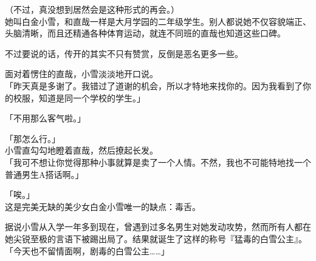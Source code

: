 （不过，真没想到居然会是这种形式的再会。）\\

她叫白金小雪，和直哉一样是大月学园的二年级学生。别人都说她不仅容貌端正、头脑清晰，而且还精通各种体育运动，就连不同班的直哉也知道这些口碑。

不过要说的话，传开的其实不只有赞赏，反倒是恶名更多一些。

面对着愣住的直哉，小雪淡淡地开口说。\\

「昨天真是多谢了。我错过了道谢的机会，所以才特地来找你的。因为我看到了你的校服，知道是同一个学校的学生。」

「不用那么客气啦。」

「那怎么行。」\\

小雪直勾勾地瞪着直哉，然后撩起长发。\\

「我可不想让你觉得那种小事就算是卖了一个人情。不然，我也不可能特地找一个普通男生A搭话啊。」

「唉。」\\

这是完美无缺的美少女白金小雪唯一的缺点：毒舌。

据说小雪从入学一年多到现在，曾遇到过多名男生对她发动攻势，然而所有人都在她尖锐至极的言语下被踢出局了。结果就诞生了这样的称号『猛毒的白雪公主』。\\

「今天也不留情面啊，剧毒的白雪公主……」

